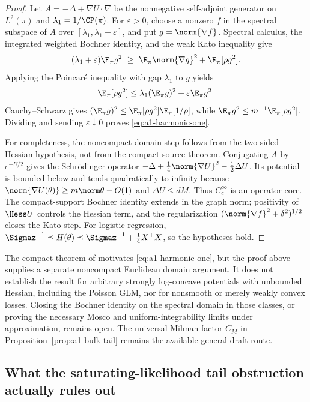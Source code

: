 \documentclass[../../main.tex]{subfiles}
\begin{document}
\begin{proof}
Let $A=-\Delta+\nabla U\cdot\nabla$ be the nonnegative self-adjoint generator on $L^2(\pi)$ and
$\lambda_1=1/\CP(\pi)$. For $\varepsilon>0$, choose a nonzero $f$ in the spectral subspace of
$A$ over $[\lambda_1,\lambda_1+\varepsilon]$, and put $g=\norm{\nabla f}$. Spectral calculus,
the integrated weighted Bochner identity, and the weak Kato inequality give
\[
 (\lambda_1+\varepsilon)\E_\pi g^2
 \ \ge\ \E_\pi\norm{\nabla g}^2+\E_\pi[\rho g^2].
\]
Applying the Poincar\'e inequality with gap $\lambda_1$ to $g$ yields
\[
 \E_\pi[\rho g^2]\le
 \lambda_1(\E_\pi g)^2+\varepsilon\E_\pi g^2.
\]
Cauchy--Schwarz gives
$(\E_\pi g)^2\le\E_\pi[\rho g^2]\E_\pi[1/\rho]$, while
$\E_\pi g^2\le m^{-1}\E_\pi[\rho g^2]$. Dividing and sending
$\varepsilon\downarrow0$ proves \eqref{eq:a1-harmonic-one}.

For completeness, the noncompact domain step follows from the two-sided Hessian hypothesis, not
from the compact source theorem. Conjugating $A$ by $e^{-U/2}$ gives the Schr\"odinger operator
$-\Delta+\frac14\norm{\nabla U}^2-\frac12\Delta U$. Its potential is bounded below and tends
quadratically to infinity because $\norm{\nabla U(\theta)}\ge m\norm\theta-O(1)$ and
$\Delta U\le dM$. Thus $C_c^\infty$ is an operator core. The compact-support Bochner identity
extends in the graph norm; positivity of $\Hess U$ controls the Hessian term, and the regularization
$(\norm{\nabla f}^2+\delta^2)^{1/2}$ closes the Kato step. For logistic regression,
$\Sigmaz^{-1}\preceq H(\theta)\preceq\Sigmaz^{-1}+\frac14X^\top X$, so the hypotheses hold.
\end{proof}

\begin{remark}
The compact theorem of \cite{Veysseire2011SpectralGap} motivates
\eqref{eq:a1-harmonic-one}, but the proof above supplies a separate noncompact Euclidean domain
argument. It does not establish the result for arbitrary strongly log-concave potentials with
unbounded Hessian, including the Poisson GLM, nor for nonsmooth or merely weakly convex losses.
Closing the Bochner identity on the spectral domain in those classes, or proving the necessary
Mosco and uniform-integrability limits under approximation, remains open. The universal Milman
factor $C_M$ in Proposition~\ref{prop:a1-bulk-tail} remains the available general draft route.
\end{remark}

\subsection{What the saturating-likelihood tail obstruction actually rules out}
\label{subsec:a1-tail}
\end{document}
